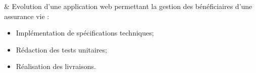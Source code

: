 
& Evolution d'une application web permettant la gestion des bénéficiaires d'une assurance vie :%
\begin{itemize}%
	\item Implémentation de spécifications techniques;%
	\item Rédaction des tests unitaires;%
	\item Réalisation des livraisons.%
\end{itemize}%


